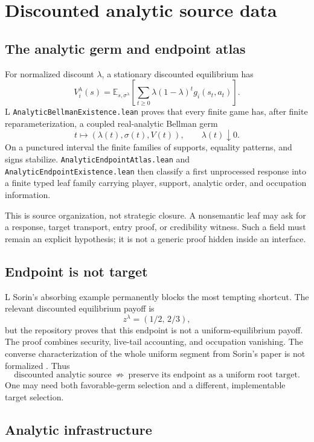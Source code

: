 \documentclass[11pt]{article}
\newcommand{\EE}{\mathbb E}
\newcommand{\LTag}{\textsf{L}}
\newcommand{\Prod}{\LTag}
\newcommand{\Status}[1]{#1}
\begin{document}
\section{Discounted analytic source data}

\subsection{The analytic germ and endpoint atlas}

For normalized discount \(\lambda\), a stationary discounted equilibrium has
\[
 V_i^\lambda(s)=\EE_{s,\sigma^\lambda}
 \left[\sum_{t\geq0}\lambda(1-\lambda)^t g_i(s_t,a_t)\right].
\tag{5}
\]
\Status{\Prod} \texttt{AnalyticBellmanExistence.lean} proves that every finite
game has, after finite reparameterization, a coupled real-analytic Bellman
germ
\[
 t\longmapsto(\lambda(t),\sigma(t),V(t)),\qquad\lambda(t)\downarrow0.
\tag{6}
\]
On a punctured interval the finite families of supports, equality patterns,
and signs stabilize.  \texttt{AnalyticEndpointAtlas.lean} and
\texttt{AnalyticEndpointExistence.lean} then classify a first unprocessed
response into a finite typed leaf family carrying player, support, analytic
order, and occupation information.

This is source organization, not strategic closure.  A nonsemantic leaf may
ask for a response, target transport, entry proof, or credibility witness.
Such a field must remain an explicit hypothesis; it is not a generic proof
hidden inside an interface.

\subsection{Endpoint is not target}

\Status{\Prod} Sorin's absorbing example permanently blocks the most tempting
shortcut.  The relevant discounted equilibrium payoff is
\[
 z^\lambda=(1/2,\,2/3),
\]
but the repository proves that this endpoint is not a
uniform-equilibrium payoff.  The proof combines security, live-tail
accounting, and occupation vanishing.  The converse characterization of the
whole uniform segment from Sorin's paper is not formalized \cite{Sorin1986}.
Thus
\[
 \text{discounted analytic source}\ \not\Rightarrow\
 \text{preserve its endpoint as a uniform root target}.
\tag{7}
\]
One may need both favorable-germ selection and a different, implementable
target selection.

\subsection{Analytic infrastructure}
\end{document}
